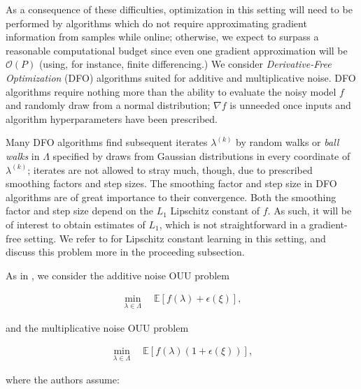 \documentclass{amsart}
\begin{document}
As a consequence of these difficulties, optimization in this setting will need to be performed by algorithms which
do not require approximating gradient information from samples while online; otherwise, we expect to surpass a reasonable computational budget since even one gradient approximation will be $\mathcal{O}(P)$ (using, for instance, finite differencing.)
We consider \textit{Derivative-Free Optimization} (DFO) algorithms suited for additive and multiplicative noise. DFO algorithms require nothing more than the ability to evaluate the noisy model $f$ and randomly draw from a normal distribution; $\nabla f$ is unneeded once inputs and algorithm hyperparameters have been prescribed.

Many DFO algorithms find subsequent iterates $\lambda^{(k)}$ by random walks or \textit{ball walks} in $\Lambda$ specified by draws from Gaussian distributions in every coordinate of $\lambda^{(k)}$; iterates are not allowed to stray much, though, due to prescribed smoothing factors and step sizes. The smoothing factor and step size in DFO algorithms are of great importance to their convergence. Both the smoothing factor and step size depend on the $L_1$ Lipschitz constant of $f$. As such, it will be of interest to obtain estimates of $L_1$, which is not straightforward in a gradient-free setting. We refer to \cite{Calliess} for Lipschitz constant learning in this setting, and discuss this problem more in the proceeding subsection.

As in \cite{CW}, we consider the additive noise OUU problem

\begin{eqnarray} \label{eq:1}
\min_{\lambda \in \Lambda} \quad \mathbb{E}\left[f(\lambda)+\epsilon(\xi)\right],
\end{eqnarray} 

\noindent and the multiplicative noise OUU problem

\begin{eqnarray} \label{eq:2}
\min_{\lambda \in \Lambda} \quad \mathbb{E}\left[f(\lambda)(1+\epsilon(\xi))\right],
\end{eqnarray} 

\noindent where the authors assume:
\end{document}
